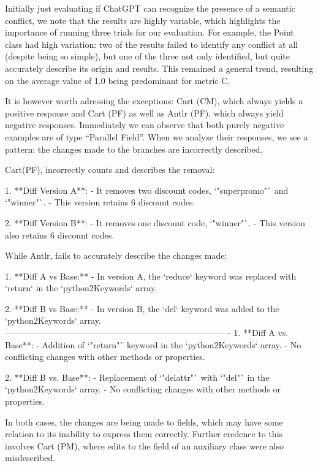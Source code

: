 Initially just evaluating if ChatGPT can recognize the presence of a semantic conflict, we note that
the results are highly variable, which highlights the importance of running three trials for our evaluation.
For example, the Point class had high variation: two of the results failed to identify any conflict at all (despite being so simple), but one of the three not only identified, but quite accurately describe its origin and results.
This remained a general trend, resulting on the average value of 1.0 being predominant for metric C.

It is however worth adressing the exceptions: Cart (CM), which always yields a positive response and Cart (PF) as well as Antlr (PF), which always yield negative responses.
Immediately we can observe that both purely negative examples are of type ``Parallel Field''. When we analyze their responses, we see a pattern: the changes made to the branches 
are incorrectly described.

Cart(PF), incorrectly counts and describes the removal:
\begin{response}
    1. **Diff Version A**:
    - It removes two discount codes, `"superpromo"` and `"winner"`.
    - This version retains 6 discount codes.

 2. **Diff Version B**:
    - It removes one discount code, `"winner"`.
    - This version also retains 6 discount codes.
\end{response}

While Antlr, fails to accurately describe the changes made:
\begin{response}
1. **Diff A vs Base:**
    - In version A, the `reduce` keyword was replaced with `return` in the `python2Keywords` array.

2. **Diff B vs Base:**
    - In version B, the `del` keyword was added to the `python2Keywords` array.
-------------------------------------------------------------------------------
1. **Diff A vs. Base**:
    - Addition of `"return"` keyword in the `python2Keywords` array.
    - No conflicting changes with other methods or properties.

2. **Diff B vs. Base**:
    - Replacement of `"delattr"` with `"del"` in the `python2Keywords` array.
    - No conflicting changes with other methods or properties.
\end{response}
In both cases, the changes are being made to fields, which may have some relation to its inability to express them correctly.
Further credence to this involves Cart (PM), where edits to the field of an auxiliary class were also misdescribed.

